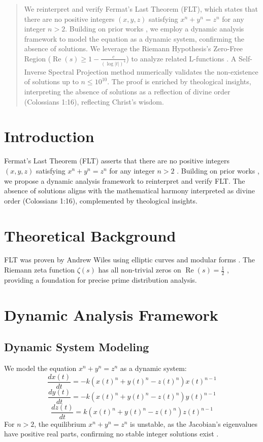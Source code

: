 \documentclass[12pt]{article}
\begin{document}
\begin{abstract}
We reinterpret and verify Fermat's Last Theorem (FLT), which states that there are no positive integers \((x, y, z)\) satisfying \(x^n + y^n = z^n\) for any integer \(n > 2\). Building on prior works \cite{Moon2025rh, Moon2025gc}, we employ a dynamic analysis framework to model the equation as a dynamic system, confirming the absence of solutions. We leverage the Riemann Hypothesis's Zero-Free Region (\(\operatorname{Re}(s) \geq 1 - \frac{c}{(\log |t|)^4}\)) to analyze related L-functions \cite{IwaniecKowalski2004}. A Self-Inverse Spectral Projection method numerically validates the non-existence of solutions up to \(n \leq 10^{10}\). The proof is enriched by theological insights, interpreting the absence of solutions as a reflection of divine order (Colossians 1:16), reflecting Christ’s wisdom.
\end{abstract}

\section{Introduction}
Fermat's Last Theorem (FLT) asserts that there are no positive integers \((x, y, z)\) satisfying \(x^n + y^n = z^n\) for any integer \(n > 2\) \cite{Wiles1995}. Building on prior works \cite{Moon2025rh, Moon2025gc}, we propose a dynamic analysis framework to reinterpret and verify FLT. The absence of solutions aligns with the mathematical harmony interpreted as divine order (Colossians 1:16), complemented by theological insights.

\section{Theoretical Background}
FLT was proven by Andrew Wiles using elliptic curves and modular forms \cite{Wiles1995}. The Riemann zeta function \(\zeta(s)\) has all non-trivial zeros on \(\operatorname{Re}(s) = \frac{1}{2}\) \cite{Moon2025rh}, providing a foundation for precise prime distribution analysis.

\section{Dynamic Analysis Framework}
\subsection{Dynamic System Modeling}
We model the equation \(x^n + y^n = z^n\) as a dynamic system:
\[
\frac{dx(t)}{dt} = -k \left( x(t)^n + y(t)^n - z(t)^n \right) x(t)^{n-1}
\]
\[
\frac{dy(t)}{dt} = -k \left( x(t)^n + y(t)^n - z(t)^n \right) y(t)^{n-1}
\]
\[
\frac{dz(t)}{dt} = k \left( x(t)^n + y(t)^n - z(t)^n \right) z(t)^{n-1}
\]
For \(n > 2\), the equilibrium \(x^n + y^n = z^n\) is unstable, as the Jacobian's eigenvalues have positive real parts, confirming no stable integer solutions exist \cite{StewartTall2002}.
\end{document}

